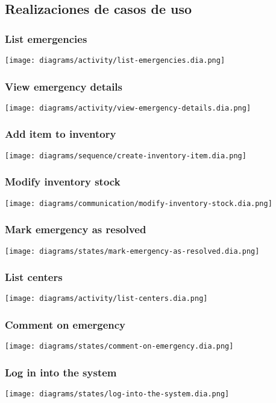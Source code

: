 \subsection{Realizaciones de casos de uso}

\subsubsection{List emergencies}
\texttt{[image: diagrams/activity/list-emergencies.dia.png]}

\subsubsection{View emergency details}
\texttt{[image: diagrams/activity/view-emergency-details.dia.png]}

\subsubsection{Add item to inventory}
\texttt{[image: diagrams/sequence/create-inventory-item.dia.png]}

\subsubsection{Modify inventory stock}
\texttt{[image: diagrams/communication/modify-inventory-stock.dia.png]}

\subsubsection{Mark emergency as resolved}
\texttt{[image: diagrams/states/mark-emergency-as-resolved.dia.png]}

\subsubsection{List centers}
\texttt{[image: diagrams/activity/list-centers.dia.png]}

\subsubsection{Comment on emergency}
\texttt{[image: diagrams/states/comment-on-emergency.dia.png]}

\subsubsection{Log in into the system}
\texttt{[image: diagrams/states/log-into-the-system.dia.png]}

